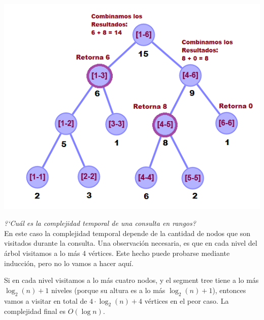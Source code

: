 \begin{minipage}{\columnwidth}
    \includegraphics[width=\linewidth]{imag/segment_tree_query_values}
    \label{fig:example_st_casos}
\end{minipage}

\noindent\textit{?`Cu\'al es la complejidad temporal de una consulta en rangos?}\\
En este caso la complejidad temporal depende de la cantidad de nodos que son visitados durante la consulta. Una observaci\'on necesaria, es que en cada nivel del \'arbol visitamos a lo m\'as 4 v\'ertices. Este hecho puede probarse mediante inducci\'on, pero no lo vamos a hacer aqu\'i. 

Si en cada nivel visitamos a lo m\'as  cuatro nodos, y el segment tree tiene a lo m\'as $\log_2(n) + 1$ niveles (porque su altura es a lo m\'as $\log_2(n) + 1$), entonces vamos a visitar en total de $4 \cdot \log_2(n) + 4$ v\'ertices en el peor caso. La complejidad final es $O(\log n)$.